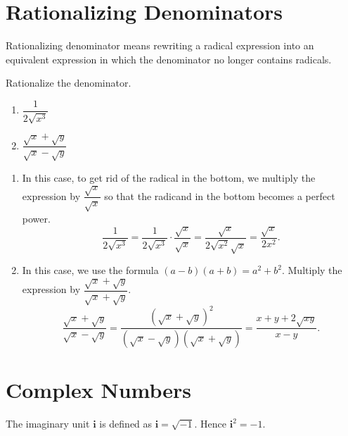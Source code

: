 \documentclass[
  en,11pt]{elegantbook}
\providecommand{\tightlist}{%
  \setlength{\itemsep}{0pt}\setlength{\parskip}{0pt}}
\newcommand{\ii}{\mathbf{i}}
\renewenvironment{example}[1][]{
  \refstepcounter{exam}
  \par\noindent\textbf{\color{main}{\examplename} \theexam #1}
  \rmfamily
}{
  \par\ignorespacesafterend
}
\begin{document}
\hypertarget{rationalizing-denominators}{%
\section{Rationalizing Denominators}\label{rationalizing-denominators}}

Rationalizing denominator means rewriting a radical expression into an equivalent expression in which the denominator no longer contains radicals.

\begin{example}

Rationalize the denominator.

\begin{enumerate}
\def\labelenumi{\arabic{enumi}.}
\tightlist
\item
  \(\dfrac{1}{2\sqrt{x^3}}\)
\item
  \(\dfrac{\sqrt{x}+\sqrt{y}}{\sqrt{x}-\sqrt{y}}\)
\end{enumerate}

\end{example}

\begin{solution}



\begin{enumerate}
\def\labelenumi{\arabic{enumi}.}
\tightlist
\item
  In this case, to get rid of the radical in the bottom, we multiply the expression by \(\dfrac{\sqrt{x}}{\sqrt{x}}\) so that the radicand in the bottom becomes a perfect power.
  \[
   \dfrac{1}{2\sqrt{x^3}}=\dfrac{1}{2\sqrt{x^3}}\cdot\dfrac{\sqrt{x}}{\sqrt{x}}=\dfrac{\sqrt{x}}{2\sqrt{x^2}\sqrt{x}}=\dfrac{\sqrt{x}}{2x^2}. 
   \]
\item
  In this case, we use the formula \((a-b)(a+b)=a^2+b^2\). Multiply the expression by \(\dfrac{\sqrt{x}+\sqrt{y}}{\sqrt{x}+\sqrt{y}}\).
  \[
   \dfrac{\sqrt{x}+\sqrt{y}}{\sqrt{x}-\sqrt{y}}=\dfrac{(\sqrt{x}+\sqrt{y})^2}{(\sqrt{x}-\sqrt{y})(\sqrt{x}+\sqrt{y})}=\dfrac{x+y+2\sqrt{xy}}{x-y}.
   \]
\end{enumerate}

\end{solution}

\hypertarget{complex-numbers}{%
\section{Complex Numbers}\label{complex-numbers}}

The imaginary unit \(\ii\) is defined as \(\ii=\sqrt{-1}\). Hence \(\ii^2=-1\).
\end{document}
